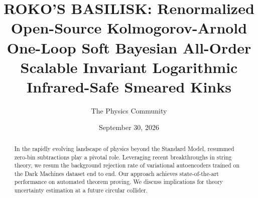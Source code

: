 \documentclass[11pt]{article}
\title{ROKO'S BASILISK: Renormalized Open-Source Kolmogorov-Arnold One-Loop Soft Bayesian All-Order Scalable Invariant Logarithmic Infrared-Safe Smeared Kinks}
\author{The Physics Community}
\date{September 30, 2026}
\begin{document}
\maketitle
\begin{abstract}
In the rapidly evolving landscape of physics beyond the Standard Model,
resummed zero-bin subtractions play a pivotal role. Leveraging recent
breakthroughs in string theory, we resum the background rejection rate
of variational autoencoders trained on the Dark Machines dataset end to
end. Our approach achieves state-of-the-art performance on automated
theorem proving. We discuss implications for theory uncertainty
estimation at a future circular collider.
\end{abstract}
\tableofcontents




\nocite{*}


\end{document}
